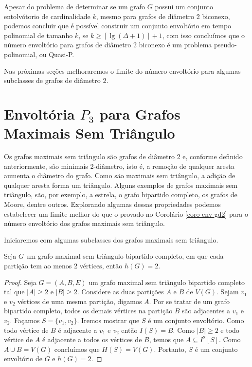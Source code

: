 Apesar do problema de determinar se um grafo $G$ possui um conjunto entolvótorio de cardinalidade $k$, mesmo para grafos de diâmetro 2 biconexo, podemos concluir que é possível construir um conjunto envoltório em tempo polinomial de tamanho $k$, se $k \ge \left\lceil \lg{(\Delta + 1)} \right\rceil + 1$, com isso concluímos que o número envoltório para grafos de diâmetro 2 biconexo é um problema pseudo-polinomial, ou Quasi-P.

Nas próximas seções melhoraremos o limite do número envoltório para algumas subclasses de grafos de diâmetro 2.


\section{Envoltória $P_3$ para Grafos Maximais Sem Triângulo}

Os grafos maximais sem triângulo são grafos de diâmetro 2 e, conforme definido anteriormente, são minimais 2-diâmetro, isto é, a remoção de qualquer aresta aumenta o diâmetro do grafo. Como são maximais sem triângulo, a adição de qualquer aresta forma um triângulo. Alguns exemplos de grafos maximais sem triângulo, são, por exemplo, a estrela, o grafo bipartido completo, os grafos de Moore, dentre outros. Explorando algumas dessas propriedades podemos estabelecer um limite melhor do que o provado no Corolário \ref{coro-env-gd2} para o número envoltório dos grafos maximais sem triângulo.

Iniciaremos com algumas subclasses dos grafos maximais sem triângulo.


\begin{proposition}
    Seja $G$ um grafo maximal sem triângulo bipartido completo, em que cada partição tem ao menos 2 vértices, então $h(G) = 2$.
\label{prop-env-knn}
\end{proposition}
\begin{proof}
   Seja $G=(A, B, E)$ um grafo maximal sem triângulo bipartido completo tal que $|A|\geq 2$ e $|B|\geq 2$. Considere as duas partições $A$ e $B$ de $V(G)$. Sejam $v_1$ e $v_2$ vértices de uma mesma partição, digamos $A$. Por se tratar de um grafo bipartido completo, todos os demais vértices na partição $B$ são adjacentes a $v_1$ e $v_2$. Façamos $S=\{v_1,v_2\}$. Iremos mostrar que $S$ é um conjunto envoltório. Como todo vértice de $B$ é adjacente a $v_1$ e $v_2$ então $I(S)=B$. Como $|B| \geq 2$ e todo vértice de $A$ é adjacente a todos os vértices de $B$, temos que $A \subseteq I^2[S]$. Como $A\cup B=V(G)$ concluímos que $H(S)=V(G)$. Portanto, $S$ é um conjunto envoltório de $G$ e $h(G)=2$.
\end{proof}


